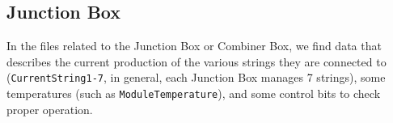 \subsection{Junction Box}
In the files related to the Junction Box or Combiner Box, we find data that describes
the current production of the various strings they are connected to (\verb|CurrentString1-7|,
in general, each Junction Box manages 7 strings), some temperatures (such as
\verb|ModuleTemperature|), and some control bits to check proper operation.




